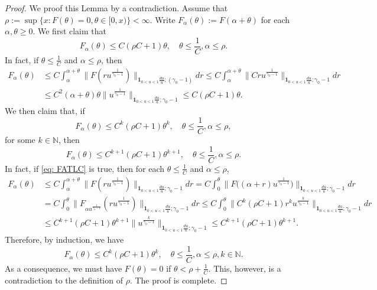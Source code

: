 \documentclass[12pt, a4paper]{amsart}
\theoremstyle{definition}
\numberwithin{equation}{section}
\begin{document}
\begin{proof}
	We proof this Lemma by a contradiction.
	Assume that $\rho :=  \sup\{x: F(\theta) = 0, \theta \in [0,x)\} < \infty$. 
	Write $F_\alpha (\theta) := F(\alpha + \theta)$ for each $\alpha, \theta \geq 0$.
	We first claim that
\[
	F_\alpha (\theta) 
	\leq C(\rho C + 1) \theta, 
	\quad \theta \leq \frac{1}{C}, \alpha \leq \rho.
\]
	In fact, if $\theta \leq \frac{1}{C}$ and $\alpha \leq \rho$, then
\[\begin{split}
	F_\alpha (\theta) 
	&\leq C\int_\alpha^{\alpha + \theta} \|F(ru^{\frac{1}{\gamma_0 - 1}}) \|_{\mathbf 1_{0<u<1}\frac{du}{u}; (\gamma_0 - 1)} dr
	\leq C\int_\alpha^{\alpha + \theta} \|Cru^{\frac{1}{\gamma_0 - 1}} \|_{\mathbf 1_{0<u<1}\frac{du}{u}; \gamma_0 - 1} dr
	\\&\leq C^2 (\alpha + \theta) \theta \|u^{\frac{1}{\gamma_0 - 1}} \|_{\mathbf 1_{0<u<1}\frac{du}{u}; \gamma_0 - 1}
	\leq C(\rho C + 1) \theta.
\end{split}\]
	We then claim that, if 
\[\label{eq: FATLC}
	F_\alpha (\theta) 
	\leq C^k(\rho C + 1) \theta^k, 
	\quad \theta \leq \frac{1}{C}, \alpha \leq \rho,
\]
	for some $k \in \mathbb N$, then
\[
	F_\alpha (\theta) 
	\leq C^{k+1}(\rho C + 1) \theta^{k+1}, 
	\quad \theta \leq \frac{1}{C}, \alpha \leq \rho.
	\]
	In fact, if \eqref{eq: FATLC} is true, then for each $\theta \leq \frac{1}{C}$ and $\alpha \leq \rho$,
\[\begin{split}
	F_\alpha (\theta) 
	&\leq C\int_\alpha^{\alpha + \theta} \|F(ru^{\frac{1}{\gamma_0 - 1}}) \|_{\mathbf 1_{0<u<1}\frac{du}{u}; \gamma_0 - 1} dr
	=  C\int_0^\theta \big \|F\big( (\alpha + r)u^{\frac{1}{\gamma_0 - 1}} \big ) \big \|_{\mathbf 1_{0<u<1}\frac{du}{u}; \gamma_0 - 1} dr
	\\& =  C\int_0^\theta \|F_{\alpha u^{\frac{1}{\gamma_0 - 1}}}( ru^{\frac{1}{\gamma_0 - 1}}) \|_{\mathbf 1_{0<u<1}\frac{du}{u}; \gamma_0 - 1} dr
	\leq C\int_0^ \theta \|C^k (\rho C+ 1) r^k u^{\frac{k}{\gamma_0 - 1} } \|_{\mathbf 1_{0<u<1}\frac{du}{u}; \gamma_0 - 1} dr
	\\&\leq C^{k+1} (\rho C + 1) \theta^{k+1} \|u^{\frac{k}{\gamma_0 - 1} } \|_{\mathbf 1_{0<u<1}\frac{du}{u}; \gamma_0 - 1}
	\leq C^{k+1} (\rho C+1) \theta^{k+1} .
\end{split}\]
	Therefore, by induction, we have
\[
	F_\alpha (\theta) 
	\leq C^k(\rho C + 1) \theta^k, 
	\quad \theta \leq \frac{1}{C}, \alpha \leq \rho, k \in \mathbb N.
\]
	As a consequence, we must have $F(\theta) = 0$ if $\theta < \rho + \frac{1}{C}$.
	This, however, is a contradiction to the definition of $\rho$. 
	The proof is complete.
\end{proof}
\end{document}
